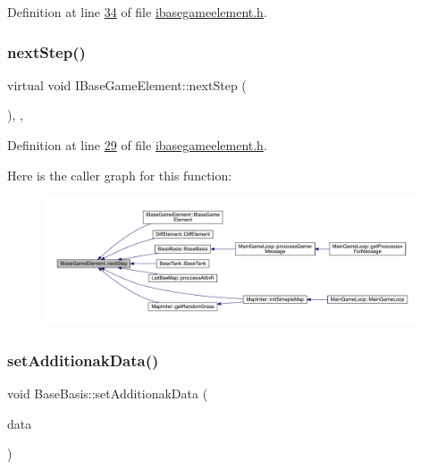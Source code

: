 Definition at line \hyperlink{a00047_source_l00034}{34} of file \hyperlink{a00047_source}{ibasegameelement.\+h}.

\mbox{\label{a00137_ae2be75da1a2a9edfabe993770e24654a}} 
\subsubsection{\texorpdfstring{next\+Step()}{nextStep()}}
{\footnotesize\ttfamily virtual void I\+Base\+Game\+Element\+::next\+Step (\begin{DoxyParamCaption}{ }\end{DoxyParamCaption})\hspace{0.3cm}{\ttfamily [inline]}, {\ttfamily [virtual]}, {\ttfamily [inherited]}}



Definition at line \hyperlink{a00047_source_l00029}{29} of file \hyperlink{a00047_source}{ibasegameelement.\+h}.

Here is the caller graph for this function\+:
\nopagebreak
\begin{figure}[H]
\begin{center}
\leavevmode
\includegraphics[width=350pt]{d2/df5/a00137_ae2be75da1a2a9edfabe993770e24654a_icgraph}
\end{center}
\end{figure}
\mbox{\label{a00149_a17b5facef5ea0c9bb9c558a90831d6f9}} 
\subsubsection{\texorpdfstring{set\+Additionak\+Data()}{setAdditionakData()}}
{\footnotesize\ttfamily void Base\+Basis\+::set\+Additionak\+Data (\begin{DoxyParamCaption}\item[{Q\+Byte\+Array $\ast$}]{data }\end{DoxyParamCaption})\hspace{0.3cm}{\ttfamily [virtual]}}




